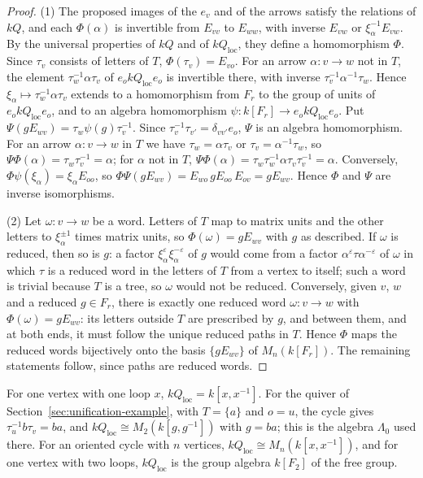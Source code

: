 \documentclass[12pt, a4paper]{report}
\theoremstyle{plain}
\theoremstyle{definition}
\theoremstyle{remark}
\theoremstyle{plain}
\begin{document}
\begin{proof}
(1) The proposed images of the $e_v$ and of the arrows satisfy the relations of $kQ$, and each $\Phi(\alpha)$ is invertible from $E_{vv}$ to $E_{ww}$, with inverse $E_{vw}$ or $\xi_\alpha^{-1}E_{vw}$. By the universal properties of $kQ$ and of $kQ_{\mathrm{loc}}$, they define a homomorphism $\Phi$. Since $\tau_v$ consists of letters of $T$, $\Phi(\tau_v)=E_{vo}$. For an arrow $\alpha:v\to w$ not in $T$, the element $\tau_w^{-1}\alpha\tau_v$ of $e_okQ_{\mathrm{loc}}e_o$ is invertible there, with inverse $\tau_v^{-1}\alpha^{-1}\tau_w$. Hence $\xi_\alpha\mapsto\tau_w^{-1}\alpha\tau_v$ extends to a homomorphism from $F_r$ to the group of units of $e_okQ_{\mathrm{loc}}e_o$, and to an algebra homomorphism $\psi:k[F_r]\to e_okQ_{\mathrm{loc}}e_o$. Put $\Psi(gE_{wv})=\tau_w\psi(g)\tau_v^{-1}$. Since $\tau_v^{-1}\tau_{v'}=\delta_{vv'}e_o$, $\Psi$ is an algebra homomorphism. For an arrow $\alpha:v\to w$ in $T$ we have $\tau_w=\alpha\tau_v$ or $\tau_v=\alpha^{-1}\tau_w$, so $\Psi\Phi(\alpha)=\tau_w\tau_v^{-1}=\alpha$; for $\alpha$ not in $T$, $\Psi\Phi(\alpha)=\tau_w\tau_w^{-1}\alpha\tau_v\tau_v^{-1}=\alpha$. Conversely, $\Phi\psi(\xi_\alpha)=\xi_\alpha E_{oo}$, so $\Phi\Psi(gE_{wv})=E_{wo}\,gE_{oo}\,E_{ov}=gE_{wv}$. Hence $\Phi$ and $\Psi$ are inverse isomorphisms.

(2) Let $\omega:v\to w$ be a word. Letters of $T$ map to matrix units and the other letters to $\xi_\alpha^{\pm1}$ times matrix units, so $\Phi(\omega)=gE_{wv}$ with $g$ as described. If $\omega$ is reduced, then so is $g$: a factor $\xi_\alpha^{\varepsilon}\xi_\alpha^{-\varepsilon}$ of $g$ would come from a factor $\alpha^{\varepsilon}\tau\alpha^{-\varepsilon}$ of $\omega$ in which $\tau$ is a reduced word in the letters of $T$ from a vertex to itself; such a word is trivial because $T$ is a tree, so $\omega$ would not be reduced. Conversely, given $v$, $w$ and a reduced $g\in F_r$, there is exactly one reduced word $\omega:v\to w$ with $\Phi(\omega)=gE_{wv}$: its letters outside $T$ are prescribed by $g$, and between them, and at both ends, it must follow the unique reduced paths in $T$. Hence $\Phi$ maps the reduced words bijectively onto the basis $\{gE_{wv}\}$ of $M_n(k[F_r])$. The remaining statements follow, since paths are reduced words.
\end{proof}

For one vertex with one loop $x$, $kQ_{\mathrm{loc}}=k[x,x^{-1}]$. For the quiver of Section~\ref{sec:unification-example}, with $T=\{a\}$ and $o=u$, the cycle gives $\tau_u^{-1}b\tau_v=ba$, and $kQ_{\mathrm{loc}}\cong M_2(k[g,g^{-1}])$ with $g=ba$; this is the algebra $\Lambda_0$ used there. For an oriented cycle with $n$ vertices, $kQ_{\mathrm{loc}}\cong M_n(k[x,x^{-1}])$, and for one vertex with two loops, $kQ_{\mathrm{loc}}$ is the group algebra $k[F_2]$ of the free group.
\end{document}
